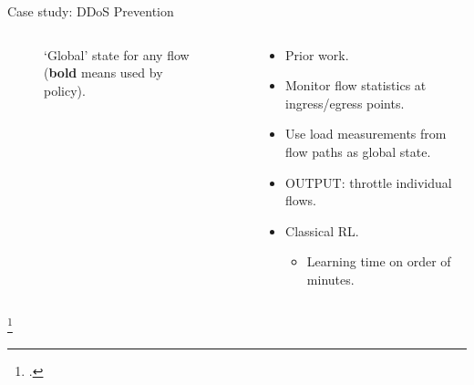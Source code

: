 \documentclass[aspectratio=169,xcolor={dvipsnames}
,handout
]{beamer}
\begin{document}
\begin{frame}{Case study: DDoS Prevention}
\begin{columns}
\begin{column}{0.4\linewidth}
\begin{figure}
{\begin{tikzpicture}
					\end{tikzpicture}
				}
			\caption{`Global' state for any flow (\textbf{bold} means used by policy).}
			\end{figure}
		\end{column}
		\begin{column}{0.6\linewidth}
			\begin{itemize}
				\item Prior work\footnotemark.
				\item Monitor flow statistics at ingress/egress points.
				\item Use load measurements from flow paths as global state.
				\item OUTPUT: throttle individual flows.
				\item Classical RL.
				\begin{itemize}
					\item Learning time on order of minutes.
				\end{itemize}
			\end{itemize}
		\end{column}
	\end{columns}
\footcitetext{DBLP:journals/tnsm/SimpsonRP20}
\end{frame}
\end{document}
